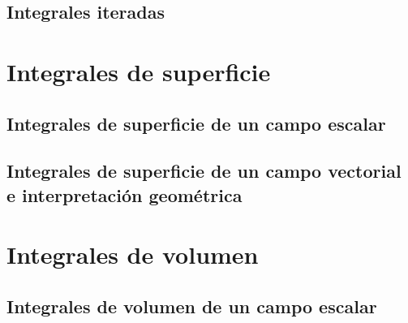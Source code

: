 \documentclass[12pt,openany]{book}
\begin{document}
	   \subsection{Integrales iteradas}

	\section{Integrales de superficie}

	   \subsection{Integrales de superficie de un campo escalar}

	   \subsection{Integrales de superficie de un campo vectorial e interpretaci\'on geom\'etrica}

	\section{Integrales de volumen}

		\subsection{Integrales de volumen de un campo escalar}

\end{document}
